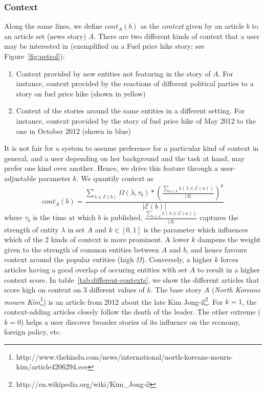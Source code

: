 \subsubsection*{Context}
Along the same lines, we define $cont_{A}(b)$ as the \emph{context} given by an article $b$ to an article set (news story) $A$. There are two different kinds of context that a user may be interested in (exemplified on a Fuel price hike story; see Figure~\ref{fig:petrol}):
\begin{enumerate}
\item Context provided by new entities not featuring in the story of $A$. For instance, context provided by the reactions of different political parties to a story on fuel price hike (shown in yellow)
\item Context of the stories around the same entities in a different setting. For instance, context provided by the story of fuel price hike of May 2012 to the one in October 2012 (shown in blue)
\end{enumerate}
It is not fair for a system to assume preference for a particular kind of context in general, and a user depending on her background and the task at hand, may prefer one kind over another. Hence, we drive this feature through a user-adjustable parameter $k$. 
We quantify context as
\begin{equation}
cont_{A}(b) = \frac{\sum_{\lambda \in \mathcal{E}(b)}{\Omega(\lambda, \tau_b)*(\frac{\sum_{a \in A}\mathbb{1}(\lambda \in \mathcal{E}(a))}{|A|})^{k}}}{|\mathcal{E}(b)|}
\end{equation}
where $\tau_b$ is the time at which $b$ is published, $\frac{\sum_{a \in A}\mathbb{1}(\lambda \in \mathcal{E}(a))}{|A|}$ captures the strength of entity $\lambda$ in set $A$ and $k \in [0, 1]$ is the parameter which influences which of the 2 kinds of context is more prominent. A lower $k$ dampens the weight given to the strength of common entities between $A$ and $b$, and hence favours context 
around the popular entities (high $\Omega$). Conversely, a higher $k$ forces articles having a good overlap of occuring entities with set $A$ to result in a higher context score.
In table~\ref{tab:different-contexts}, we show the different articles that score high on context on 3 different values of $k$. The base story $A$ ({\em North Koreans mourn Kim}\footnote{http://www.thehindu.com/news/international/north-koreans-mourn-kim/article4206294.ece}) is an article from 2012 about the late Kim Jong-il\footnote{http://en.wikipedia.org/wiki/Kim\_Jong-il}. 
For $k=1$, the context-adding articles closely follow the death of the leader. The other extreme ($k=0$) helps a user discover broader stories of its influence on the economy, foreign policy, etc.

